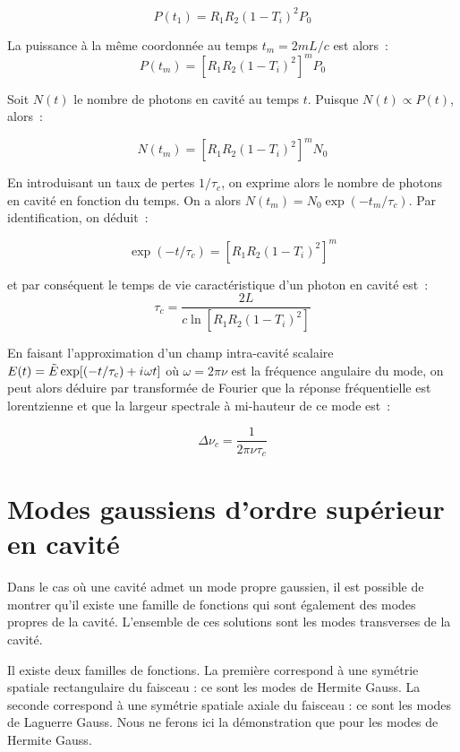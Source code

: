 \documentclass[a4paper]{book}
\newcommand{\iu}{{i\mkern1mu}}
\begin{document}
\begin{equation}
    P(t_1)=R_1R_2(1-T_i)^2P_0
\end{equation}

La puissance à la même coordonnée au temps $t_m = 2mL/c$ est alors~:
\begin{equation}
    P(t_m)=\left[R_1R_2(1-T_i)^2\right]^mP_0
\end{equation}

Soit $N(t)$ le nombre de photons en cavité au temps $t$. Puisque $N(t)\propto P(t)$, alors~:

\begin{equation}
    N(t_m)=\left[R_1R_2(1-T_i)^2\right]^mN_0
\end{equation}

En introduisant un taux de pertes $1/\tau_c$, on exprime alors le nombre de photons en cavité en fonction du temps. On a alors $N(t_m) = N_0\exp(-t_m/\tau_c)$. Par identification, on déduit~:

\begin{equation}
    \exp(-t/\tau_c)=\left[R_1R_2(1-T_i)^2\right]^m
\end{equation}

et par conséquent le temps de vie caractéristique d'un photon en cavité est~:
\begin{equation}
    \tau_c = \frac{2L}{c \ln[R_1R_2(1-T_i)^2]}
\end{equation}

En faisant l'approximation d'un champ intra-cavité scalaire $E(t) = \tilde E\exp[(-t/\tau_c)+\iu \omega t]$ où $\omega = 2\pi \nu$ est la fréquence angulaire du mode, on peut alors déduire par transformée de Fourier que la réponse fréquentielle est lorentzienne et que la largeur spectrale à mi-hauteur de ce mode est~:

\begin{equation}
    \Delta \nu_c = \frac{1}{2\pi\nu\tau_c}
\end{equation}


\section{Modes gaussiens d'ordre supérieur en cavité}


Dans le cas où une cavité admet un mode propre gaussien, il est possible de montrer qu'il existe une famille de fonctions qui sont également des modes propres de la cavité. L'ensemble de ces solutions sont les modes transverses de la cavité.

Il existe deux familles de fonctions. La première correspond à une symétrie spatiale rectangulaire du faisceau : ce sont les
modes de Hermite Gauss. La seconde correspond à une symétrie spatiale axiale du faisceau : ce sont les modes de Laguerre Gauss.
Nous ne ferons ici la démonstration que pour les modes de Hermite Gauss.
\end{document}
